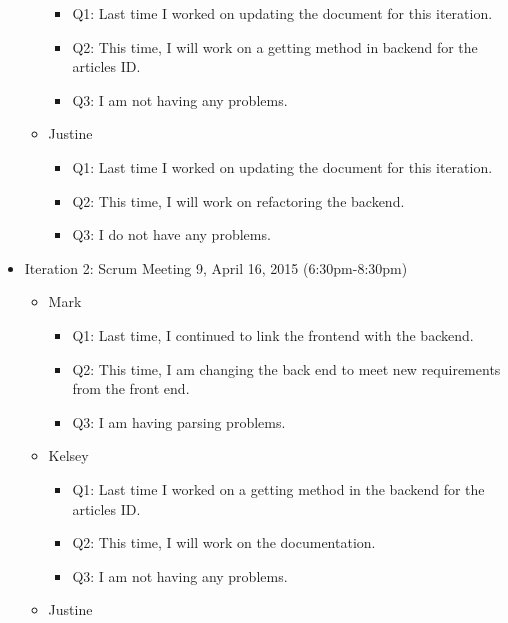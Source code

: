 \documentclass[]{article}
\begin{document}
\begin{itemize}
\begin{itemize}
    \begin{itemize}
    \itemsep1pt\parskip0pt
    \item
      Q1: Last time I worked on updating the document for this
      iteration.
    \item
      Q2: This time, I will work on a getting method in backend for the
      articles ID.
    \item
      Q3: I am not having any problems.
    \end{itemize}
  \item
    Justine

    \begin{itemize}
    \itemsep1pt\parskip0pt
    \item
      Q1: Last time I worked on updating the document for this
      iteration.
    \item
      Q2: This time, I will work on refactoring the backend.
    \item
      Q3: I do not have any problems.
    \end{itemize}
  \end{itemize}
\item
  Iteration 2: Scrum Meeting 9, April 16, 2015 (6:30pm-8:30pm)

  \begin{itemize}
  \itemsep1pt\parskip0pt
  \item
    Mark

    \begin{itemize}
    \itemsep1pt\parskip0pt
    \item
      Q1: Last time, I continued to link the frontend with the backend.
    \item
      Q2: This time, I am changing the back end to meet new requirements
      from the front end.
    \item
      Q3: I am having parsing problems.
    \end{itemize}
  \item
    Kelsey

    \begin{itemize}
    \itemsep1pt\parskip0pt
    \item
      Q1: Last time I worked on a getting method in the backend for the
      articles ID.
    \item
      Q2: This time, I will work on the documentation.
    \item
      Q3: I am not having any problems.
    \end{itemize}
  \item
    Justine


\end{itemize}
\end{itemize}
\end{document}
